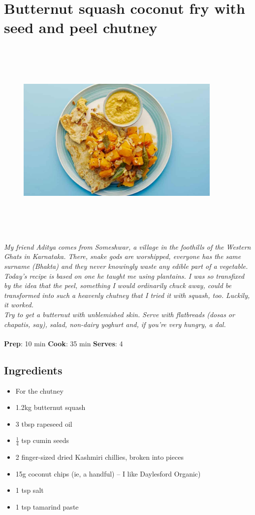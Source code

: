 \documentclass{book}
\begin{document}
\section{Butternut squash coconut fry with seed and peel chutney}
\begin{figure}
\centering\includegraphics[width=10cm,height=10cm,keepaspectratio]{Recipe_Pictures/Butternut_squash_coconut_fry_with_seed_and_peel_chutney.png}
\end{figure}
\emph{My friend Aditya comes from Someshwar, a village in the foothills of the Western Ghats in Karnataka. There, snake gods are worshipped, everyone has the same surname (Bhakta) and they never knowingly waste any edible part of a vegetable. Today’s recipe is based on one he taught me using plantains. I was so transfixed by the idea that the peel, something I would ordinarily chuck away, could be transformed into such a heavenly chutney that I tried it with squash, too. Luckily, it worked.\\ 
Try to get a butternut with unblemished skin. Serve with flatbreads (dosas or chapatis, say), salad, non-dairy yoghurt and, if you’re very hungry, a dal.}\\\\ 
\textbf{Prep}: 10 min
\textbf{Cook}: 35 min
\textbf{Serves}: 4
\subsection*{Ingredients}
\begin{itemize}
\item For the chutney
\item 1.2kg butternut squash
\item 3 tbsp rapeseed oil
\item $\frac{1}{4}$ tsp cumin seeds
\item 2 finger-sized dried Kashmiri chillies, broken into pieces
\item 15g coconut chips (ie, a handful) – I like Daylesford Organic)
\item 1 tsp salt
\item 1 tsp tamarind paste
\end{itemize}
\end{document}
